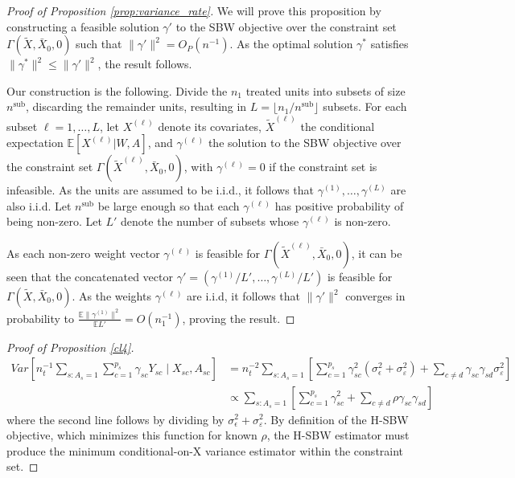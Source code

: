 \begin{proof}[Proof of Proposition \ref{prop:variance_rate}] We will prove this proposition by constructing a feasible solution $\gamma'$ to the SBW objective over the constraint set $\Gamma(\tilde{X}, \bar{X}_0, 0)$ such that $\|\gamma'\|^2 = O_P(n^{-1})$. As the optimal solution $\gamma^*$ satisfies $\|\gamma^*\|^2 \leq \|\gamma'\|^2$, the result follows.

Our construction is the following. Divide the $n_1$ treated units into subsets of size $n^{\text{sub}}$, discarding the remainder units, resulting in $L = \lfloor n_1/n^{\text{sub}} \rfloor$ subsets. For each subset $\ell=1,\ldots,L$, let $X^{(\ell)}$ denote its covariates, $\tilde{X}^{(\ell)}$ the conditional expectation $\mathbb{E}[X^{(\ell)}|W, A]$, and  $\gamma^{(\ell)}$ the solution to the SBW objective over the constraint set $\Gamma(\tilde{X}^{(\ell)}, \bar{X}_0, 0)$, with $\gamma^{(\ell)}=0$ if the constraint set is infeasible. As the units are assumed to be i.i.d., it follows that $\gamma^{(1)}, \ldots, \gamma^{(L)}$ are also i.i.d. Let $n^{\text{sub}}$ be large enough so that each $\gamma^{(\ell)}$ has positive probability of being non-zero. Let $L'$ denote the number of subsets whose $\gamma^{(\ell)}$ is non-zero.

As each non-zero weight vector $\gamma^{(\ell)}$ is feasible for $\Gamma(\tilde{X}^{(\ell)}, \bar{X}_0, 0)$, it can be seen that the concatenated vector $\gamma' = (\gamma^{(1)}/L', \ldots, \gamma^{(L)}/L')$ is feasible for $\Gamma(\tilde{X},\bar{X}_0,0)$. As the weights $\gamma^{(\ell)}$ are i.i.d, it follows that $\| \gamma'\|^2$ converges in probability to $\frac{\mathbb{E}\|\gamma^{(1)}\|^2}{\mathbb{E}L'} = O(n_1^{-1})$, proving the result.
\end{proof}

\begin{proof}[Proof of Proposition \ref{cl4}]
\begin{align*}
    Var[n_t^{-1}\sum_{s: A_s = 1}\sum_{c = 1}^{p_s}\gamma_{sc}Y_{sc} \mid X_{sc}, A_{sc}] &= n_t^{-2}\sum_{s: A_s = 1}[\sum_{c = 1}^{p_s}\gamma_{sc}^2(\sigma^2_{\epsilon} + \sigma^2_{\varepsilon}) + \sum_{c \ne d}\gamma_{sc}\gamma_{sd}\sigma^2_{\varepsilon}] \\
    &\propto \sum_{s: A_s = 1}[\sum_{c = 1}^{p_s}\gamma_{sc}^2 + \sum_{c \ne d}\rho \gamma_{sc}\gamma_{sd}]
\end{align*}
%
where the second line follows by dividing by $\sigma^2_{\epsilon} + \sigma^2_{\varepsilon}$. By definition of the H-SBW objective, which minimizes this function for known $\rho$, the H-SBW estimator must produce the minimum conditional-on-X variance estimator within the constraint set.
\end{proof}

